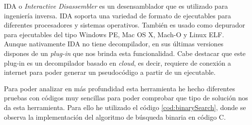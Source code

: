 
IDA o \textit{Interactive Disassembler} es un desensamblador que es utilizado para ingeniería inversa. IDA soporta una variedad de formato de ejecutables para diferentes procesadores y
sistemas operativos. También es usado como depurador para ejecutables del tipo Windows PE, Mac OS X, Mach-O y Linux ELF\cite{IDAPro_Wikipedia}. Aunque nativamente IDA no tiene decompilador,
en sus últimas versiones dispones de un \textit{plug-in} que nos brinda esta funcionalidad. Cabe destacar que este plug-in es un decompilador basado en \textit{cloud}, es decir, requiere
de conexión a internet para poder generar un pseudocódigo a partir de un ejecutable.

Para poder analizar en más profundidad esta herramienta he hecho diferentes pruebas con códigos muy sencillas para poder comprobar que tipo de solución nos da esta herramienta. Para ello
he utilizado el código \ref{cod:binarySearch}, donde se observa la implementación del algoritmo de búsqueda binaria en código C.

